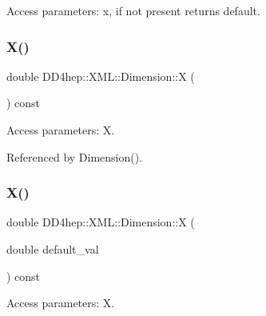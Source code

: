 Access parameters\+: x, if not present returns default. 

\hypertarget{struct_d_d4hep_1_1_x_m_l_1_1_dimension_a82731be8e9c0288c26159b1fde83a0af}{}\label{struct_d_d4hep_1_1_x_m_l_1_1_dimension_a82731be8e9c0288c26159b1fde83a0af} 
\subsubsection{\texorpdfstring{X()}{X()}\hspace{0.1cm}{\footnotesize\ttfamily [1/2]}}
{\footnotesize\ttfamily double D\+D4hep\+::\+X\+M\+L\+::\+Dimension\+::X (\begin{DoxyParamCaption}{ }\end{DoxyParamCaption}) const}



Access parameters\+: X. 



Referenced by Dimension().

\hypertarget{struct_d_d4hep_1_1_x_m_l_1_1_dimension_af78bec5e9228f7e89226ce43ec8d1a45}{}\label{struct_d_d4hep_1_1_x_m_l_1_1_dimension_af78bec5e9228f7e89226ce43ec8d1a45} 
\subsubsection{\texorpdfstring{X()}{X()}\hspace{0.1cm}{\footnotesize\ttfamily [2/2]}}
{\footnotesize\ttfamily double D\+D4hep\+::\+X\+M\+L\+::\+Dimension\+::X (\begin{DoxyParamCaption}\item[{double}]{default\+\_\+val }\end{DoxyParamCaption}) const}



Access parameters\+: X. 

\hypertarget{struct_d_d4hep_1_1_x_m_l_1_1_dimension_a35264d351ee612a6c98be0d884ff4ad6}{}\label{struct_d_d4hep_1_1_x_m_l_1_1_dimension_a35264d351ee612a6c98be0d884ff4ad6} 
